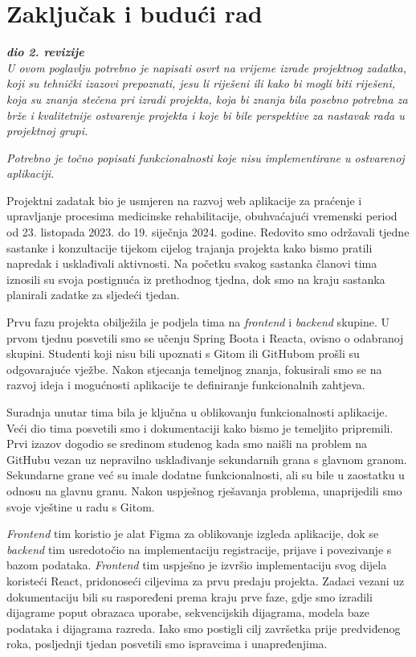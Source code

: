 \chapter{Zaključak i budući rad}
		
		\textbf{\textit{dio 2. revizije}}\\
		
		 \textit{U ovom poglavlju potrebno je napisati osvrt na vrijeme izrade projektnog zadatka, koji su tehnički izazovi prepoznati, jesu li riješeni ili kako bi mogli biti riješeni, koja su znanja stečena pri izradi projekta, koja bi znanja bila posebno potrebna za brže i kvalitetnije ostvarenje projekta i koje bi bile perspektive za nastavak rada u projektnoj grupi.}
		
		 \textit{Potrebno je točno popisati funkcionalnosti koje nisu implementirane u ostvarenoj aplikaciji.}
		

  Projektni zadatak bio je usmjeren na razvoj web aplikacije za praćenje i upravljanje procesima medicinske rehabilitacije, obuhvaćajući vremenski period od 23. listopada 2023. do 19. siječnja 2024. godine. Redovito smo održavali tjedne sastanke i konzultacije tijekom cijelog trajanja projekta kako bismo pratili napredak i usklađivali aktivnosti. Na početku svakog sastanka članovi tima iznosili su svoja postignuća iz prethodnog tjedna, dok smo na kraju sastanka planirali zadatke za sljedeći tjedan.

Prvu fazu projekta obilježila je podjela tima na \textit{frontend} i \textit{backend} skupine. U prvom tjednu posvetili smo se učenju Spring Boota i Reacta, ovisno o odabranoj skupini. Studenti koji nisu bili upoznati s Gitom ili GitHubom prošli su odgovarajuće vježbe. Nakon stjecanja temeljnog znanja, fokusirali smo se na razvoj ideja i mogućnosti aplikacije te definiranje funkcionalnih zahtjeva.

Suradnja unutar tima bila je ključna u oblikovanju funkcionalnosti aplikacije. Veći dio tima posvetili smo i dokumentaciji kako bismo je temeljito pripremili. Prvi izazov dogodio se sredinom studenog kada smo naišli na problem na GitHubu vezan uz nepravilno usklađivanje sekundarnih grana s glavnom granom. Sekundarne grane već su imale dodatne funkcionalnosti, ali su bile u zaostatku u odnosu na glavnu granu. Nakon uspješnog rješavanja problema, unaprijedili smo svoje vještine u radu s Gitom.

\textit{Frontend} tim koristio je alat Figma za oblikovanje izgleda aplikacije, dok se \textit{backend} tim usredotočio na implementaciju registracije, prijave i povezivanje s bazom podataka. \textit{Frontend} tim uspješno je izvršio implementaciju svog dijela koristeći React, pridonoseći ciljevima za prvu predaju projekta. Zadaci vezani uz dokumentaciju bili su raspoređeni prema kraju prve faze, gdje smo izradili dijagrame poput obrazaca uporabe, sekvencijskih dijagrama, modela baze podataka i dijagrama razreda. Iako smo postigli cilj završetka prije predviđenog roka, posljednji tjedan posvetili smo ispravcima i unapređenjima.

